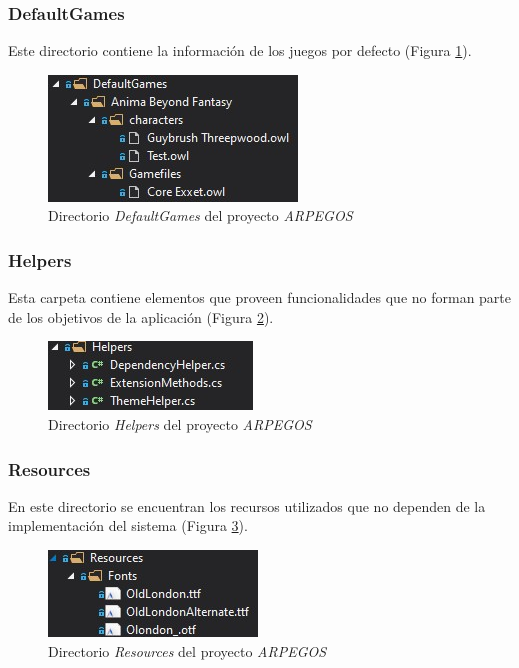 {\subsubsection{DefaultGames}
Este directorio contiene la información de los juegos por defecto (Figura \ref*{DefaultGames}).

\begin{figure}[H]
    \centering
    \includegraphics[scale=1.5]{Images/ARPEGOS_DefaultGames.jpg}
    \caption{Directorio \textit{DefaultGames} del proyecto \textit{ARPEGOS}}
    \label{DefaultGames}    
\end{figure}

\subsubsection{Helpers}
Esta carpeta contiene elementos que proveen funcionalidades que no 
forman parte de los objetivos de la aplicación (Figura \ref*{Helpers}).

\begin{figure}[H]
    \centering
    \includegraphics[scale=1.5]{Images/ARPEGOS_Helpers.jpg}
    \caption{Directorio \textit{Helpers} del proyecto \textit{ARPEGOS}}
    \label{Helpers}    
\end{figure}


\subsubsection{Resources}
En este directorio se encuentran los recursos utilizados que no dependen 
de la implementación del sistema (Figura \ref*{Resources}).

\begin{figure}[H]
    \centering
    \includegraphics[scale=1.5]{Images/ARPEGOS_Resources.jpg}
    \caption{Directorio \textit{Resources} del proyecto \textit{ARPEGOS}}
    \label{Resources}    
\end{figure}\newpage

}
